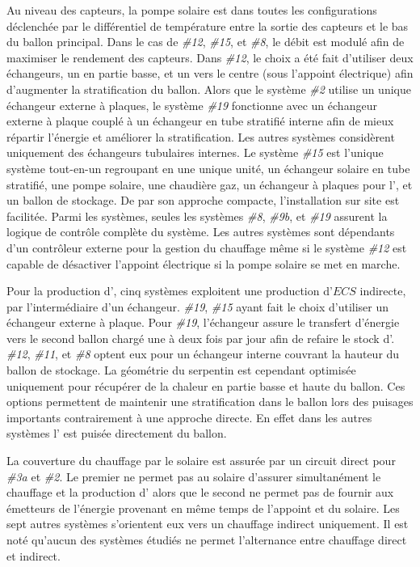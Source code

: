 Au niveau des capteurs, la pompe solaire est dans toutes les configurations déclenchée par
le différentiel de température entre la sortie des capteurs et le bas du ballon principal.
Dans le cas de \emph{\#12}, \emph{\#15}, et \emph{\#8}, le débit est modulé afin de
maximiser le rendement des capteurs. Dans \emph{\#12}, le choix a été fait d’utiliser deux
échangeurs, un en partie basse, et un vers le centre (sous l’appoint électrique) afin
d’augmenter la stratification du ballon. Alors que le système \emph{\#2} utilise
un unique échangeur externe à plaques, le système \emph{\#19} fonctionne avec un
échangeur externe à plaque couplé à un échangeur en tube stratifié interne afin de mieux
répartir l’énergie et améliorer la stratification. Les autres systèmes considèrent
uniquement des échangeurs tubulaires internes.
Le système \emph{\#15} est l’unique système tout-en-un regroupant en une unique unité,
un échangeur solaire en tube stratifié, une pompe solaire,
une chaudière gaz, un échangeur à plaques pour l’, et un ballon de stockage.
De par son approche compacte, l’installation sur site est facilitée.
Parmi les systèmes, seules les systèmes \emph{\#8}, \emph{\#9b},
et \emph{\#19} assurent la logique de contrôle complète du système. Les autres systèmes
sont dépendants d’un contrôleur externe pour la gestion du chauffage même si le système
\emph{\#12} est capable de désactiver l’appoint électrique si la pompe solaire se met en marche.

Pour la production d’, cinq systèmes exploitent une production
d’$ECS$ indirecte, par l’intermédiaire d’un échangeur. \emph{\#19}, \emph{\#15} ayant fait le
choix d’utiliser un échangeur externe à plaque. Pour \emph{\#19}, l’échangeur
assure le transfert d’énergie vers le second ballon chargé une à deux fois par jour afin
de refaire le stock d’. \emph{\#12}, \emph{\#11}, et \emph{\#8} optent eux pour
un échangeur interne couvrant la hauteur du ballon de stockage. La géométrie
du serpentin est cependant optimisée uniquement pour récupérer de la chaleur en
partie basse et haute du ballon. Ces options permettent de maintenir une
stratification dans le ballon lors des puisages importants contrairement à une approche
directe. En effet dans les autres systèmes l’ est puisée directement du ballon.

La couverture du chauffage par le solaire est assurée par un circuit direct pour
\emph{\#3a} et \emph{\#2}. Le premier ne permet pas au solaire d’assurer simultanément
le chauffage et la production d’ alors que le second ne permet pas de fournir
aux émetteurs de l’énergie provenant en même temps de l’appoint et du solaire.
Les sept autres systèmes s’orientent eux vers un chauffage indirect uniquement. Il est noté
qu’aucun des systèmes étudiés ne permet l’alternance entre chauffage direct et indirect.

